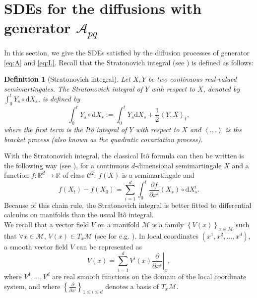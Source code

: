 \documentclass[10pt,a4paper]{article}
\newcommand\cA{\mathcal{A}}
\newcommand\cC{\mathcal{C}}
\newcommand\cM{\mathcal{M}}
\newcommand\dR{\mathbb{R}}
\newcommand\dd{\mathrm{d}}
\newcommand{\BRA}[1]{{{\left\{#1\right\}}}} %
\newcommand{\SCA}[1]{{{\left\langle #1\right\rangle}}} %
\let \ssection=\section
\renewcommand{\section}{\setcounter{equation}{0}\ssection}
\newtheorem{definition}[theorem]{Definition}
\begin{document}
\section{SDEs for the diffusions with generator  $\cA_{pq}$ }\label{A:SDE}


In this section, we give the SDEs satisfied by the diffusion processes of generator \eqref{eq:A} and \eqref{eq:L}. 
Recall that the Stratonovich integral (see \cite[page 82]{Protter04}) is defined as follows:
\begin{definition}[Stratonovich integral]
Let $X,Y$ be two continuous real-valued semimartingales. The Stratonovich integral of $Y$ with respect to $X$, denoted by $\int_0^tY_s\circ\dd X_s$, is defined by
\[
\int_0^tY_s\circ\dd X_s:=\int_0^t Y_s\dd X_s+\frac{1}{2}\SCA{Y,X}_t,
\]
where the first term is the Itô integral of $Y$ with respect to $X$ and $\SCA{.,.}$ is the bracket process (also known as the quadratic covariation process).
\end{definition}

With the Stratonovich integral, the classical Itô formula can then be written is the following way (see \cite[Theorems 20-21, pages 277-278]{Protter04}), for a continuous $d$-dimensional semimartingale $X$ and a function $f:\dR^d\to\dR$ of class $\cC^2$: $f(X)$ is a semimartingale and
\begin{equation}\label{chainrule}
f(X_t)-f(X_0)=\sum_{i=1}^d\int_0^t\frac{\partial f}{\partial x^{i}}(X_s)\circ\dd X^i_s.
\end{equation}Because of this chain rule, the Stratonovich integral is better fitted to differential calculus on manifolds than the usual Itô integral. \\



We recall that a vector field $V$ on a manifold $\cM$ is a family $\BRA{V(x)}_{x\in\cM}$ such that $\forall x\in\cM$, $V(x)\in T_x\cM$ (see for e.g. \cite[Chapter 4]{Lee03}). In local coordinates $(x^1,x^2,...,x^d)$, a smooth vector field $V$ can be represented as
\[
V(x)=\sum_{i=1}^d V^{i}(x)\left.\frac{\partial}{\partial x^{i}}\right\vert_x,
\]
where $V^1,\ldots,V^d$ are real smooth functions on the domain of the local coordinate system, and where $\BRA{\frac{\partial}{ \partial x^i}}_{1\le i\le d}$ denotes a basis of $T_x\cM$.
\end{document}
